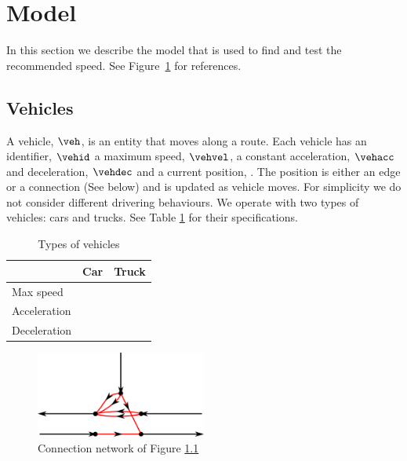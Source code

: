\section{Model}
In this section we describe the model that is used to find and test the recommended speed.
See Figure~\ref{fig:Introduction:network} for references.

\subsection{Vehicles}
A vehicle, $\veh$, is an entity that moves along a route.
Each vehicle has an identifier, $\vehid$ a maximum speed, $\vehvel$, a constant acceleration, $\vehacc$ and deceleration, $\vehdec$ and a current position, \vehpos. The position is either an edge or a connection (See below) and is updated as vehicle moves.
For simplicity we do not consider different drivering behaviours.
We operate with two types of vehicles: cars and trucks. See Table \ref{table.vehicleTypes} for their specifications.
\begin{table}
\centering
\begin{tabular}{|l|l|l|}\hline
				& Car 	& Truck \\\hline
Max speed 		& 		& \\\hline
Acceleration 	&		& \\\hline
Deceleration 	&		& \\\hline
\end{tabular}
\caption{Types of vehicles}\label{table.vehicleTypes}
\end{table}
\begin{figure}[htb]
\centering
\includegraphics[width=0.5\textwidth]{images/ConnectionNetwork.png}
\caption{Connection network of Figure \ref{}}
\label{fig:Introduction:network}
\end{figure}
